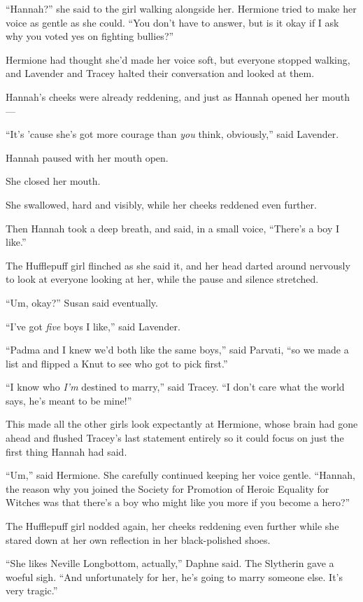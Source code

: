 “Hannah?” she said to the girl walking alongside her. Hermione tried to make
her voice as gentle as she could. “You don’t have to answer, but is it okay if
I ask why you voted yes on fighting bullies?”

Hermione had thought she’d made her voice soft, but everyone stopped walking,
and Lavender and Tracey halted their conversation and looked at them.

Hannah’s cheeks were already reddening, and just as Hannah opened her mouth—

“It’s ’cause she’s got more courage than \emph{you} think, obviously,” said
Lavender.

Hannah paused with her mouth open.

She closed her mouth.

She swallowed, hard and visibly, while her cheeks reddened even further.

Then Hannah took a deep breath, and said, in a small voice, “There’s a boy I
like.”

The Hufflepuff girl flinched as she said it, and her head darted around
nervously to look at everyone looking at her, while the pause and silence
stretched.

“Um, okay?” Susan said eventually.

“I’ve got \emph{five} boys I like,” said Lavender.

“Padma and I knew we’d both like the same boys,” said Parvati, “so we made a
list and flipped a Knut to see who got to pick first.”

“I know who \emph{I’m} destined to marry,” said Tracey. “I don’t care what the
world says, he’s meant to be mine!”

This made all the other girls look expectantly at Hermione, whose brain had
gone ahead and flushed Tracey’s last statement entirely so it could focus on
just the first thing Hannah had said.

“Um,” said Hermione. She carefully continued keeping her voice gentle. “Hannah,
the reason why you joined the Society for Promotion of Heroic Equality for
Witches was that there’s a boy who might like you more if you become a hero?”

The Hufflepuff girl nodded again, her cheeks reddening even further while she
stared down at her own reflection in her black-polished shoes.

“She likes Neville Longbottom, actually,” Daphne said. The Slytherin gave a
woeful sigh. “And unfortunately for her, he’s going to marry someone else. It’s
very tragic.”

